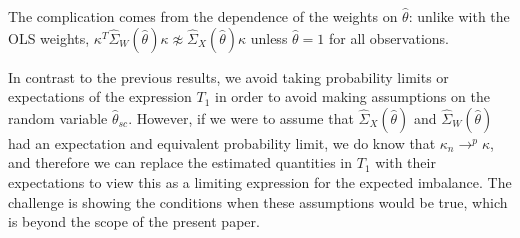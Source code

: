 \begin{remark}
    The complication comes from the dependence of the weights on $\hat{\theta}$: unlike with the OLS weights, $\kappa^T\hat{\Sigma}_W(\hat{\theta})\kappa \not\approx \hat{\Sigma}_X(\hat{\theta})\kappa$ unless $\hat{\theta} = 1$ for all observations. 
\end{remark}

\begin{remark}
    In contrast to the previous results, we avoid taking probability limits or expectations of the expression $T_1$ in order to avoid making assumptions on the random variable $\hat{\theta}_{sc}$. However, if we were to assume that $\hat{\Sigma}_X(\hat{\theta})$ and $\hat{\Sigma}_W(\hat{\theta})$ had an expectation and equivalent probability limit, we do know that $\kappa_n \to^p \kappa$, and therefore we can replace the estimated quantities in $T_1$ with their expectations to view this as a limiting expression for the expected imbalance. The challenge is showing the conditions when these assumptions would be true, which is beyond the scope of the present paper.
\end{remark}





